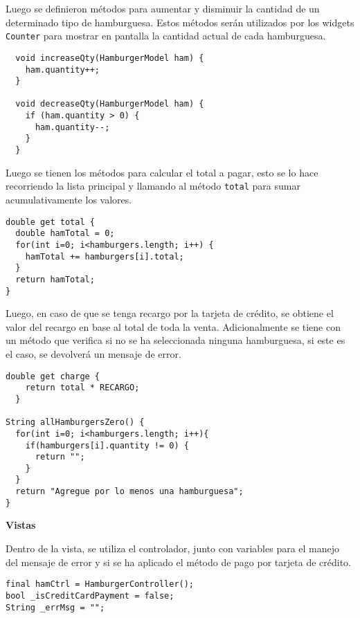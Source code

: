 Luego se definieron métodos para aumentar y disminuir la cantidad de un determinado tipo de hamburguesa. Estos métodos serán utilizados por los widgets \lstinline{Counter} para mostrar en pantalla la cantidad actual de cada hamburguesa.

\begin{center}
\begin{lstlisting}
  void increaseQty(HamburgerModel ham) {
    ham.quantity++;
  }

  void decreaseQty(HamburgerModel ham) {
    if (ham.quantity > 0) {
      ham.quantity--;
    }
  }
\end{lstlisting}
\end{center}

Luego se tienen los métodos para calcular el total a pagar, esto se lo hace recorriendo la lista principal y llamando al método \lstinline{total} para sumar acumulativamente los valores.

\begin{center}
\begin{lstlisting}
double get total {
  double hamTotal = 0;
  for(int i=0; i<hamburgers.length; i++) {
    hamTotal += hamburgers[i].total;
  }
  return hamTotal;
}
\end{lstlisting}
\end{center}

Luego, en caso de que se tenga recargo por la tarjeta de crédito, se obtiene el valor del recargo en base al total de toda la venta. Adicionalmente se tiene con un método que verifica si no se ha seleccionada ninguna hamburguesa, si este es el caso, se devolverá un mensaje de error.

\begin{center}
\begin{lstlisting}
double get charge {
    return total * RECARGO;
  }

String allHamburgersZero() {
  for(int i=0; i<hamburgers.length; i++){
    if(hamburgers[i].quantity != 0) {
      return "";
    }
  }
  return "Agregue por lo menos una hamburguesa";
}
\end{lstlisting}
\end{center}

\textbf{Vistas}

Dentro de la vista, se utiliza el controlador, junto con variables para el manejo del mensaje de error y si se ha aplicado el método de pago por tarjeta de crédito.

\begin{center}
\begin{lstlisting}
final hamCtrl = HamburgerController();
bool _isCreditCardPayment = false;
String _errMsg = "";
\end{lstlisting}
\end{center}

